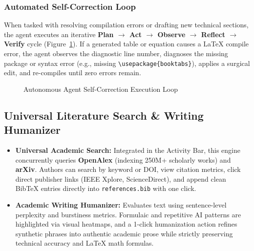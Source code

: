 \documentclass[12pt,a4paper]{article}
\newcommand{\code}[1]{\texttt{#1}}
\begin{document}
\subsubsection*{Automated Self-Correction Loop}
When tasked with resolving compilation errors or drafting new technical sections, the agent executes an iterative \textbf{Plan $\to$ Act $\to$ Observe $\to$ Reflect $\to$ Verify} cycle (Figure~\ref{fig:agent_loop}). If a generated table or equation causes a \LaTeX{} compile error, the agent observes the diagnostic line number, diagnoses the missing package or syntax error (e.g., missing \code{\textbackslash usepackage\{booktabs\}}), applies a surgical edit, and re-compiles until zero errors remain.

\begin{figure}[htbp]
\centering
{}
\caption{Autonomous Agent Self-Correction Execution Loop}
\label{fig:agent_loop}
\end{figure}

\subsection{Universal Literature Search \& Writing Humanizer}
\begin{itemize}
    \item \textbf{Universal Academic Search:} Integrated in the Activity Bar, this engine concurrently queries \textbf{OpenAlex} (indexing 250M+ scholarly works) and \textbf{arXiv}. Authors can search by keyword or DOI, view citation metrics, click direct publisher links (IEEE Xplore, ScienceDirect), and append clean Bib\TeX{} entries directly into \code{references.bib} with one click.
    \item \textbf{Academic Writing Humanizer:} Evaluates text using sentence-level perplexity and burstiness metrics. Formulaic and repetitive AI patterns are highlighted via visual heatmaps, and a 1-click humanization action refines synthetic phrases into authentic academic prose while strictly preserving technical accuracy and \LaTeX{} math formulas.
\end{itemize}
\end{document}
